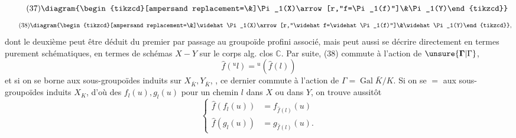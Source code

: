 \[
\tag{37}\diagram{\begin{tikzcd}[ampersand replacement=\&]\Pi_1(X)\arrow[r,"f=\Pi_1(f)"]\&\Pi_1(Y)\end{tikzcd}}
\]
\[
\tag{38}\diagram{\begin{tikzcd}[ampersand replacement=\&]\widehat\Pi_1(X)\arrow[r,"\widehat f=\widehat\Pi_1(f)"]\&\widehat\Pi_1(Y)\end{tikzcd}},
\]
dont le deuxième peut être déduit du premier par passage au groupoïde profini associé, mais peut aussi se décrire directement en termes purement schématiques, en termes  de schémas  $X\mathbin{-}Y$ sur le corps alg. clos $\mathbb C$. Par suite, (38) commute à l'action de $\unsure{\mathbf{\Gamma}|\Gamma}$,
\[
\tag{39}\widehat f({}^ul)={}^u(\widehat f(l))
\]
et si on se borne aux sous-groupoïdes induits sur $X_{\bar K},Y_{\bar K}$, , ce dernier commute à l'action de $\Gamma=\operatorname{Gal}\bar K/K$. Si on se $=$ aux sous-groupoïdes induits $X_K$, d'où des $f_l(u),g_l(u)$ pour un chemin $l$ dans $X$ ou dans $Y$, on trouve aussitôt
\[
\tag{40}\left\{\begin{aligned}
\widehat f(f_l(u))&=f_{\widehat f(l)}(u)\\
\widehat f(g_l(u))&=g_{\widehat f(l)}(u).
\end{aligned}\right.
\]
